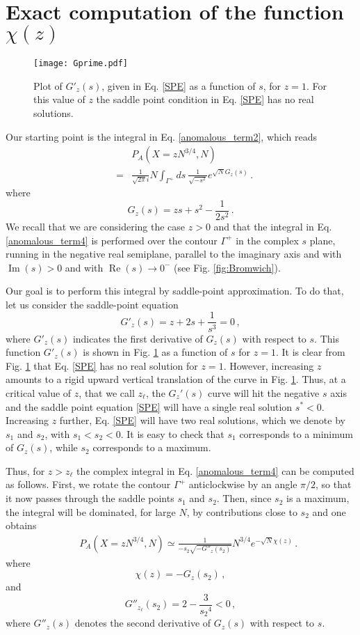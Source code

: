 \documentclass[aps,pre,twocolumn,superscriptaddress,showpacs]{revtex4-1}
\newcommand{\be}{\begin{equation}}
\newcommand{\ee}{\end{equation}}
\newcommand{\bea}{\begin{eqnarray}}
\newcommand{\eea}{\end{eqnarray}}
\begin{document}
\section{Exact computation of the function $\chi(z)$}
\label{app:chi}

\begin{figure}
\centering
\texttt{[image: Gprime.pdf]} 
\caption{Plot of $G'_z(s)$, given in Eq. \eqref{SPE} as a function of $s$, for $z=1$. For this value of $z$ the saddle point condition in Eq. \eqref{SPE} has no real solutions.}
\label{fig:SPE}
\end{figure}


Our starting point is the integral in Eq. \eqref{anomalous_term2}, which reads
\bea
\label{anomalous_term4}
&&P_A(X= z N^{3/4},N)\\
&=&\frac{1}{\sqrt{2\pi} i} N
\int_{\Gamma^+} ds~\frac{1}{\sqrt{-s^2}} e^{\sqrt{N}G_z(s)}\,.\nonumber
\eea
where 
\be
G_z(s)=z s+s^2-\frac{1}{2s^2}\,.
\label{Gs}
\ee
We recall that we are considering the case $z>0$ and that the integral in Eq. \eqref{anomalous_term4} is performed over the contour $\Gamma^+$ in the complex $s$ plane, running in the negative real semiplane, parallel to the imaginary axis and with $\operatorname{Im}(s)>0$ and with $\operatorname{Re}(s)\to 0^-$ (see Fig. \ref{fig:Bromwich}). 

Our goal is to perform this integral by saddle-point approximation. To do that, let us consider the saddle-point equation
\be
G'_z(s)=z +2s+\frac{1}{s^3}=0\,,
\label{SPE}
\ee
where $G'_z(s)$ indicates the first derivative of $G_z(s)$ with respect to $s$. This function $G'_z(s)$ is shown in Fig. \ref{fig:SPE} as a function of $s$ for $z=1$. It is clear from Fig. \ref{fig:SPE} that Eq. \eqref{SPE} has no real solution for $z=1$. However, increasing $z$ amounts to a rigid upward vertical translation of the curve in Fig. \ref{fig:SPE}. Thus, at a critical value of $z$, that we call $z_{\ell}$, the $G_z'(s)$ curve will hit the negative $s$ axis and the saddle point equation \eqref{SPE} will have a single real solution $s^*<0$. Increasing $z$ further, Eq. \eqref{SPE} will have two real solutions, which we denote by $s_1$ and $s_2$, with $s_1<s_2<0$. It is easy to check that $s_1$ corresponds to a minimum of $G_z(s)$, while $s_2$ corresponds to a maximum.

Thus, for $z>z_{\ell}$ the complex integral in Eq. \eqref{anomalous_term4} can be computed as follows. First, we rotate the contour $\Gamma^+$ anticlockwise by an angle $\pi/2$, so that it now passes through the saddle points $s_1$ and $s_2$. Then, since $s_2$ is a maximum, the integral will be dominated, for large $N$, by contributions close to $s_2$ and one obtains
\bea
&&P_A(X= z N^{3/4},N)\simeq \frac{1}{-s_2 \sqrt{-G''_z(s_2)}} N^{3/4} e^{-\sqrt{N}\chi(z)}\,.\nonumber
\label{anomalous_term5}
\eea
where
\be 
\chi(z)=-G_z(s_2)\,,
\label{chi_definition}
\ee
and
\be
G''_{z_{\ell}}(s_2)=2-\frac{3}{{s_2}^4}<0\,,
\label{condition2}
\ee
where $G''_z(s)$ denotes the second derivative of $G_z(s)$ with respect to $s$.
\end{document}
